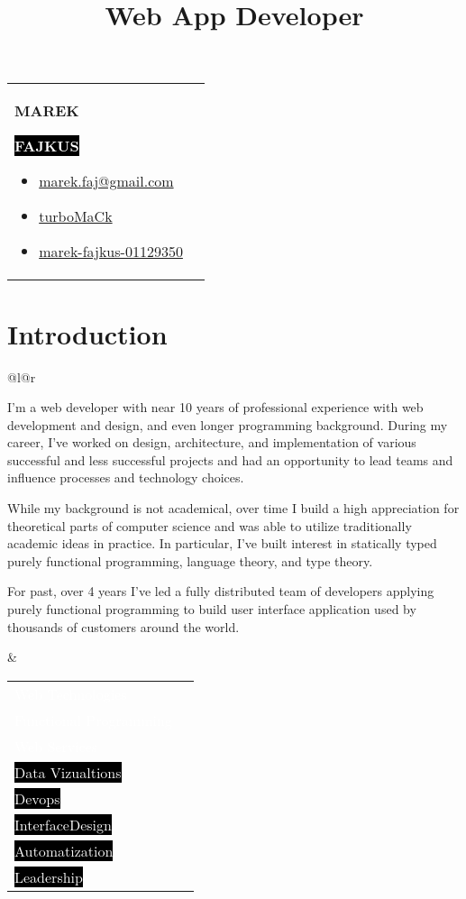 \documentclass[9pt]{article}
\makeatletter
\def\firstname{Marek}
\def\lastname{Fajkus}
\def\faEmail{{\FAFR \symbol{"F0E0}}} %
\def\faLinkedin{\FAB \symbol{"F08C}} %
\def\faGithub{\FAB \symbol{"F09B}} %
\def\faStarEmpty{\FAFR \symbol{"F005}} %
\def\faStarFull{\FAFS \symbol{"F005}} %
\def\faStarHalf{\FAFS \symbol{"F5C0}} %
\renewcommand{\maketitle}{
  \begin{tabularx}{\textwidth}{@{}l l}
    \begin{minipage}[t]{0.65\textwidth}
      {\Huge \textbf {\MakeUppercase{\firstname}}}

      \vspace{0.2cm}

      \colorbox{black}{
        {\huge \textbf {\textcolor{white}{\MakeUppercase{\lastname}}}}
      }

      \vspace{0.4cm}

      {\LARGE\emph\thetitle}
    \end{minipage}

    \begin{minipage}[t]{0.35\textwidth}
      \vspace{-\baselineskip} %
      \begin{itemize}
        \itemsep0em
      \vspace{-0.5cm}
      \item \href{mailto:marek.faj@gmail.com}{
        \colorbox{ProcessBlue}{\textcolor{white}{\faEmail}} { \textcolor{ProcessBlue}{marek.faj@gmail.com}}
      }
      \item \href{https://github.com/turbomack}{
        \colorbox{black}{\textcolor{white}{\faGithub}} { turboMaCk}
      }
      \item \href{https://www.linkedin.com/in/marek-fajkus-01129350/}{
        \colorbox{black}{\textcolor{white}{\faLinkedin}} { marek-fajkus-01129350}
      }
      \end{itemize}
    \end{minipage}
  \end{tabularx}

  \vspace{0.5cm}
}
\newcommand{\skill}[3]{ %
  \colorbox{#3}{\textcolor{white}{#1}} &
  \vspace{0.2cm}
  \textcolor{#3}{
    \newcount \n
    \n #2
    \multido{\i=0+10}{5}{%
      \ifnum\n<10
        \ifnum\n>0 \faStarHalf \else \faStarEmpty \fi
      \else
        \faStarFull
      \fi
      \advance\n -10
    }
  } \\
}
\makeatother
\begin{document}
\title{Web App Developer}

\lhead{}
\rhead{}

\thispagestyle{empty}

\maketitle

\section{Introduction}

\begin{tabular}{@{}l@{\hskip 20pt}r}
    \begin{minipage}[l]{0.58\textwidth}
      I'm a web developer with near 10 years of professional experience
      with web development and design, and even longer programming background.
      During my career, I've worked on design, architecture, and implementation
      of various successful and less successful projects and had an opportunity
      to lead teams and influence processes and technology choices.

      \vspace{0.5em}
      While my background is not academical, over time I build a high appreciation for
      theoretical parts of computer science and was able to utilize traditionally
      academic ideas in practice. In particular, I've built interest in
      statically typed purely functional programming, language theory, and type theory.

      \vspace{0.5em}
      For past, over 4 years I've led a fully distributed team of developers applying
      purely functional programming to build user interface application used by thousands
      of customers around the world.

    \end{minipage}
    &
    \begin{minipage}[r]{0.39\textwidth}
      \setlength\tabcolsep{5pt}
      \begin{tabularx}{\textwidth}{Xr}
        \skill{Web Technologies}{45}{ProcessBlue}
        \skill{Functional Programming}{40}{ProcessBlue}
        \skill{Web Services}{35}{ProcessBlue}
        \skill{Data Vizualtions}{30}{black}
        \skill{Devops}{25}{black}
        \skill{InterfaceDesign}{25}{black}
        \skill{Automatization}{30}{black}
        \skill{Leadership}{30}{black}
      \end{tabularx}
    \end{minipage} \\
\end{tabular}
\end{document}
